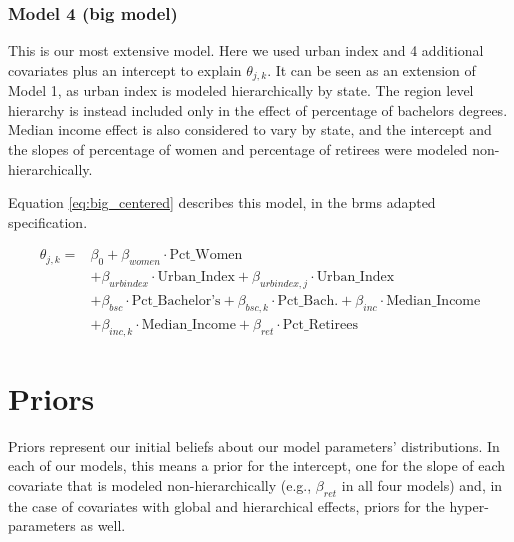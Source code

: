 \documentclass[12pt]{article}
\begin{document}
\subsubsection*{Model 4 (big model)}


This is our most extensive model.
Here we used urban index and 4 additional covariates plus an intercept to explain $\theta_{j,k}$.
It can be seen as an extension of Model 1, as urban index is modeled hierarchically by state. The region level hierarchy is instead included only in the effect of percentage of bachelors degrees.
Median income effect is also considered to vary by state, and the intercept and the slopes of percentage of women and percentage of retirees were modeled non-hierarchically.

Equation \ref{eq:big_centered} describes this model, in the brms adapted specification.

\begin{equation} \label{eq:big_centered}
	\begin{aligned}
		\theta_{j,k} = & \beta_0 + \beta_{women} \cdot \text{Pct\_Women}                                                                              \\
		& + \beta_{urbindex} \cdot \text{Urban\_Index} + \beta_{urbindex, j} \cdot \text{Urban\_Index}                                 \\
		& + \beta_{bsc} \cdot \text{Pct\_Bachelor's} + \beta_{bsc,k} \cdot \text{Pct\_Bach.} + \beta_{inc} \cdot \text{Median\_Income} \\
		& + \beta_{inc,k} \cdot \text{Median\_Income} + \beta_{ret} \cdot \text{Pct\_Retirees}
	\end{aligned}
\end{equation}













\section{Priors}

Priors represent our initial beliefs about our model parameters' distributions.
In each of our models, this means a prior for the intercept, one for the slope of each covariate that is modeled non-hierarchically (e.g., $\beta_{ret}$ in all four models) and, in the case of covariates with global and hierarchical effects, priors for the hyper-parameters as well.
\end{document}
